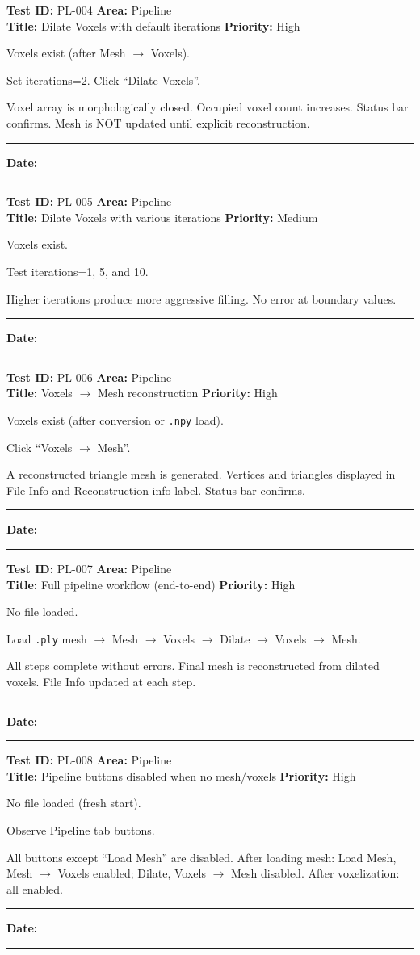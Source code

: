 \documentclass[12pt,a4paper]{article}
\newenvironment{testcase}[4]{%
  \smallskip
  \noindent\textbf{Test ID:} #1 \hfill \textbf{Area:} #2 \\
  \textbf{Title:} #3 \hfill \textbf{Priority:} #4
  \begin{description}[leftmargin=2em,style=nextline]
    \item[\textbf{Preconditions:}]
}{%
    \item[\textbf{Steps:}]
    \item[\textbf{Expected Result:}]
    \item[\textbf{Status:}] \rule{3cm}{0.4pt} \hspace{1em} \textbf{Date:} \rule{3cm}{0.4pt}
    \item[\textbf{Notes:}]
  \end{description}
  \smallskip
}
\begin{document}
\begin{testcase}{PL-004}{Pipeline}{Dilate Voxels with default iterations}{High}
  \item Voxels exist (after Mesh $\rightarrow$ Voxels).
  \item Set iterations=2. Click ``Dilate Voxels''.
  \item Voxel array is morphologically closed. Occupied voxel count increases. Status bar confirms. Mesh is NOT updated until explicit reconstruction.
\end{testcase}

\begin{testcase}{PL-005}{Pipeline}{Dilate Voxels with various iterations}{Medium}
  \item Voxels exist.
  \item Test iterations=1, 5, and 10.
  \item Higher iterations produce more aggressive filling. No error at boundary values.
\end{testcase}

\begin{testcase}{PL-006}{Pipeline}{Voxels $\rightarrow$ Mesh reconstruction}{High}
  \item Voxels exist (after conversion or \texttt{.npy} load).
  \item Click ``Voxels $\rightarrow$ Mesh''.
  \item A reconstructed triangle mesh is generated. Vertices and triangles displayed in File Info and Reconstruction info label. Status bar confirms.
\end{testcase}

\begin{testcase}{PL-007}{Pipeline}{Full pipeline workflow (end-to-end)}{High}
  \item No file loaded.
  \item Load \texttt{.ply} mesh $\rightarrow$ Mesh $\rightarrow$ Voxels $\rightarrow$ Dilate $\rightarrow$ Voxels $\rightarrow$ Mesh.
  \item All steps complete without errors. Final mesh is reconstructed from dilated voxels. File Info updated at each step.
\end{testcase}

\begin{testcase}{PL-008}{Pipeline}{Pipeline buttons disabled when no mesh/voxels}{High}
  \item No file loaded (fresh start).
  \item Observe Pipeline tab buttons.
  \item All buttons except ``Load Mesh'' are disabled. After loading mesh: Load Mesh, Mesh $\rightarrow$ Voxels enabled; Dilate, Voxels $\rightarrow$ Mesh disabled. After voxelization: all enabled.
\end{testcase}
\end{document}
